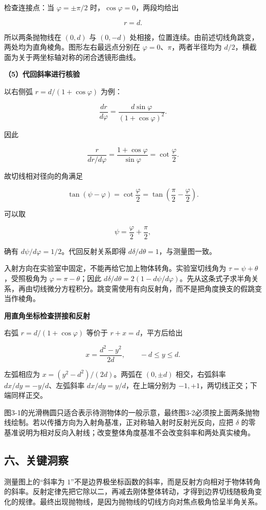 \documentclass[12pt,a4paper,UTF8]{ctexart}
\begin{document}
检查连接点：当 \(\varphi=\pm\pi/2\) 时，\(\cos\varphi=0\)，两段均给出

\[r=d.\]

所以两条抛物线在 \((0,d)\) 与 \((0,-d)\)
处相接，位置连续。由前述切线角跳变，两处均为直角棱角。图形左右最远点分别在
\(\varphi=0\)、\(\pi\)，两者半径均为
\(d/2\)，横截面为关于两坐标轴对称的闭合透镜形曲线。

\textbf{（5）代回斜率进行核验}

以右侧弧 \(r=d/(1+\cos\varphi)\) 为例：

\[\frac{dr}{d\varphi}=
\frac{d\sin\varphi}{(1+\cos\varphi)^2}.\]

因此

\[\frac{r}{dr/d\varphi}
=\frac{1+\cos\varphi}{\sin\varphi}
=\cot\frac\varphi2.\]

故切线相对径向的角满足

\[\tan(\psi-\varphi)=\cot\frac\varphi2
=\tan\left(\frac\pi2-\frac\varphi2\right).\]

可以取

\[\psi=\frac\varphi2+\frac\pi2,\]

确有 \(d\psi/d\varphi=1/2\)。代回反射关系即得
\(d\delta/d\theta=1\)，与测量图一致。

入射方向在实验室中固定，不能再给它加上物体转角。实验室切线角为
\(\tau=\psi+\theta\)，受照极角为 \(\varphi=\pi-\theta\)；因此
\(d\delta/d\theta=2(1-d\psi/d\varphi)\)。先从这条式子求半角关系，再由切线微分方程积分。跳变需使用有向反射角，而不是把角度换支的假跳变当作棱角。

\textbf{用直角坐标检查拼接和反射}

右弧 \(r=d/(1+\cos\varphi)\) 等价于 \(r+x=d\)，平方后给出

\[x=\frac{d^2-y^2}{2d},\qquad -d\le y\le d.\]

左弧相应为 \(x=(y^2-d^2)/(2d)\)。两弧在 \((0,\pm d)\) 相交，右弧斜率
\(dx/dy=-y/d\)、左弧斜率 \(dx/dy=y/d\)，在上端分别为
\(-1,+1\)，两切线正交；下端同样正交。

图3-1的光滑椭圆只适合表示待测物体的一般示意，最终图3-2必须按上面两条抛物线绘制。若以传播方向为入射角基准，正对称轴入射时反射光反向，应把
\(\delta\)
的零基准说明为相对反向入射线；改变整体角度基准不会改变斜率和两处真实棱角。

\subsection{六、关键洞察}\label{ux516dux5173ux952eux6d1eux5bdf-2}

测量图上的``斜率为
\(1\)''不是边界极坐标函数的斜率，而是反射方向相对于物体转角的斜率。反射定律先把它除以二，再减去刚体整体转动，才得到边界切线随极角变化的规律。最终出现抛物线，是因为抛物线的切线方向对焦点极角恰呈半角关系。
\end{document}
